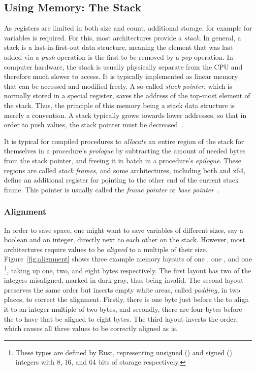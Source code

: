 \subsection{Using Memory: The Stack}

As registers are limited in both size and count, additional storage, for example for variables is required.
For this, most architectures provide a \emph{stack}.
In general, a stack is a last-in-first-out data structure, meaning the element that was last added via a \emph{push} operation is the first to be removed by a \emph{pop} operation.
In computer hardware, the stack is usually physically separate from the CPU and therefore much slower to access.
It is typically implemented as linear memory that can be accessed and modified freely.
A so-called \emph{stack pointer}, which is normally stored in a special register, saves the address of the top-most element of the stack.
Thus, the principle of this memory being a stack data structure is merely a convention.
A stack typically grows towards lower addresses, so that in order to push values, the stack pointer must be decreased~\cite[pp.~68,99,100]{Patterson2017-zq}.

It is typical for compiled procedures to \emph{allocate} an entire region of the stack for themselves in a procedure's \emph{prologue} by subtracting the amount of needed bytes from the stack pointer, and freeing it in batch in a procedure's \emph{epilogue}.
These regions are called \emph{stack frames}, and some architectures, including both \riscv{} and x64, define an additional register for pointing to the other end of the current stack frame.
This pointer is usually called the \emph{frame pointer} or \emph{base pointer}~\cite[p.~94]{Waldron1998}.

\subsubsection{Alignment}\label{sec:alignment}

In order to save space, one might want to save variables of different sizes, say a boolean and an integer, directly next to each other on the stack.
However, most architectures require values to be \emph{aligned} to a multiple of their size.
Figure~\ref{fig:alignment} shows three example memory layouts of one , one , and one \footnote{These types are defined by Rust, representing unsigned () and signed () integers with 8, 16, and 64 bits of storage respectively.}, taking up one, two, and eight bytes respectively.
The first layout has two of the integers misaligned, marked in dark gray, thus being invalid.
The second layout preserves the same order but inserts empty white areas, called \emph{padding}, in two places, to correct the alignment.
Firstly, there is one byte just before the  to align it to an integer multiple of two bytes, and secondly, there are four bytes before the  to have that be aligned to eight bytes.
The third layout inverts the order, which causes all three values to be correctly aligned as is.

